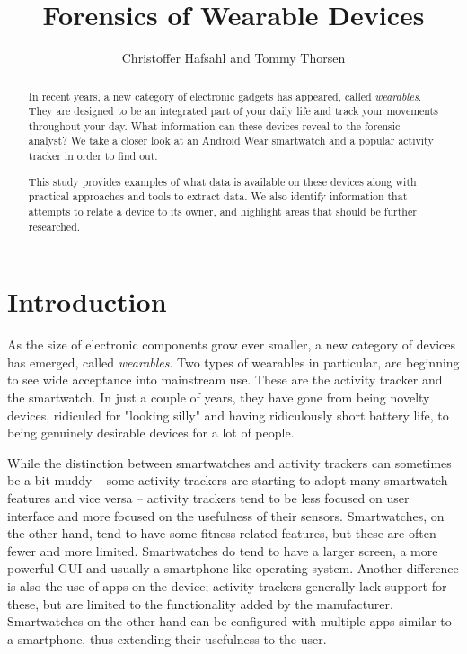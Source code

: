 \documentclass[a4paper,11pt,dvips]{article}
\begin{document}
\title{Forensics of Wearable Devices}
\author{Christoffer Hafsahl and Tommy Thorsen}
\maketitle


\begin{abstract}
In recent years, a new category of electronic gadgets has appeared, called \textit{wearables}. They are designed to be an integrated part of your daily life and track your movements throughout your day. What information can these devices reveal to the forensic analyst? We take a closer look at an Android Wear smartwatch and a popular activity tracker in order to find out.

This study provides examples of what data is available on these devices along with practical approaches and tools to extract data. We also identify information that attempts to relate a device to its owner, and highlight areas that should be further researched.
\end{abstract}


\section{Introduction}

As the size of electronic components grow ever smaller, a new category of devices has emerged, called \textit{wearables}. Two types of wearables in particular, are beginning to see wide acceptance into mainstream use. These are the activity tracker and the smartwatch. In just a couple of years, they have gone from being novelty devices, ridiculed for "looking silly" and having ridiculously short battery life, to being genuinely desirable devices for a lot of people. 

While the distinction between smartwatches and activity trackers can sometimes be a bit muddy -- some activity trackers are starting to adopt many smartwatch features and vice versa -- activity trackers tend to be less focused on user interface and more focused on the usefulness of their sensors. Smartwatches, on the other hand, tend to have some fitness-related features, but these are often fewer and more limited. Smartwatches do tend to have a larger screen, a more powerful GUI and usually a smartphone-like operating system. Another difference is also the use of apps on the device; activity trackers generally lack support for these, but are limited to the functionality added by the manufacturer. Smartwatches on the other hand can be configured with multiple apps similar to a smartphone, thus extending their usefulness to the user. 
\end{document}

